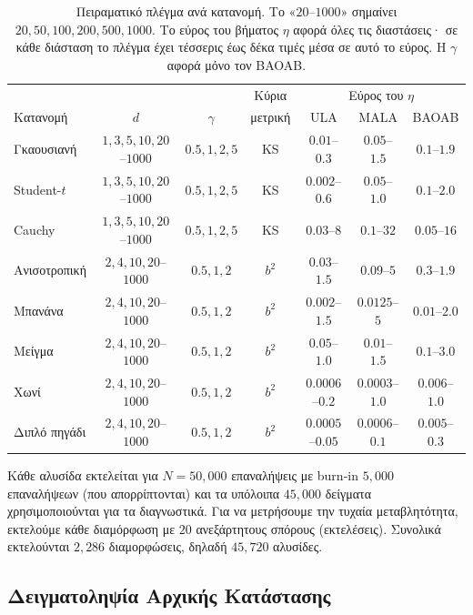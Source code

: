 \begin{table}[H]
\centering
\footnotesize
\setlength{\tabcolsep}{4pt}
\begin{tabular}{lcccccc}
\toprule
 & & & Κύρια & \multicolumn{3}{c}{Εύρος του $\eta$} \\
Κατανομή & $d$ & $\gamma$ & μετρική & ULA & MALA & BAOAB \\
\midrule
Γκαουσιανή   & $1, 3, 5, 10, 20$--$1000$ & $0.5, 1, 2, 5$ & KS & $0.01$--$0.3$  & $0.05$--$1.5$  & $0.1$--$1.9$ \\
Student-$t$  & $1, 3, 5, 10, 20$--$1000$ & $0.5, 1, 2, 5$ & KS & $0.002$--$0.6$ & $0.05$--$1.0$  & $0.1$--$2.0$ \\
Cauchy       & $1, 3, 5, 10, 20$--$1000$ & $0.5, 1, 2, 5$ & KS & $0.03$--$8$    & $0.1$--$32$    & $0.05$--$16$ \\
Ανισοτροπική & $2, 4, 10, 20$--$1000$ & $0.5, 1, 2$ & $b^2$ & $0.03$--$1.5$  & $0.09$--$5$    & $0.3$--$1.9$ \\
Μπανάνα      & $2, 4, 10, 20$--$1000$ & $0.5, 1, 2$ & $b^2$ & $0.002$--$1.5$ & $0.0125$--$5$  & $0.01$--$2.0$ \\
Μείγμα       & $2, 4, 10, 20$--$1000$ & $0.5, 1, 2$ & $b^2$ & $0.05$--$1.0$  & $0.01$--$1.5$  & $0.1$--$3.0$ \\
Χωνί         & $2, 4, 10, 20$--$1000$ & $0.5, 1, 2$ & $b^2$ & $0.0006$--$0.2$ & $0.0003$--$1.0$ & $0.006$--$1.0$ \\
Διπλό πηγάδι & $2, 4, 10, 20$--$1000$ & $0.5, 1, 2$ & $b^2$ & $0.0005$--$0.05$ & $0.0006$--$0.1$ & $0.005$--$0.3$ \\
\bottomrule
\end{tabular}
\caption{Πειραματικό πλέγμα ανά κατανομή. Το «$20$--$1000$» σημαίνει
$20, 50, 100, 200, 500, 1000$. Το εύρος του βήματος $\eta$ αφορά όλες τις
διαστάσεις· σε κάθε διάσταση το πλέγμα έχει τέσσερις έως δέκα τιμές μέσα σε αυτό το
εύρος. Η $\gamma$ αφορά μόνο τον BAOAB.}
\label{tab:eta-ranges}
\end{table}

Κάθε αλυσίδα εκτελείται για $N = 50{,}000$ επαναλήψεις με burn-in
$5{,}000$ επαναλήψεων (που απορρίπτονται) και τα υπόλοιπα $45{,}000$
δείγματα χρησιμοποιούνται για τα διαγνωστικά. Για να μετρήσουμε την τυχαία μεταβλητότητα,
εκτελούμε κάθε διαμόρφωση με $20$ ανεξάρτητους σπόρους (εκτελέσεις).
Συνολικά εκτελούνται $2{,}286$ διαμορφώσεις, δηλαδή $45{,}720$ αλυσίδες.

\subsection{Δειγματοληψία Αρχικής Κατάστασης}
\label{sec:init-state}

